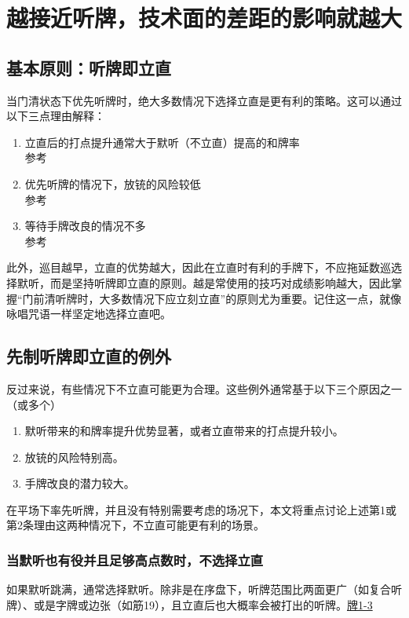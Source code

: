 \chapter[立直的判断]{越接近听牌，技术面的差距的影响就越大}
\label{lecture2}

\section{基本原则：听牌即立直}
当门清状态下优先听牌时，绝大多数情况下选择立直是更有利的策略。这可以通过以下三点理由解释：
\begin{enumerate}
    \item 立直后的打点提升通常大于默听（不立直）提高的和牌率\\
          参考
    \item 优先听牌的情况下，放铳的风险较低\\
          参考
    \item 等待手牌改良的情况不多\\
          参考
\end{enumerate}
此外，巡目越早，立直的优势越大，因此在立直时有利的手牌下，不应拖延数巡选择默听，而是坚持听牌即立直的原则。越是常使用的技巧对成绩影响越大，因此掌握“门前清听牌时，大多数情况下应立刻立直”的原则尤为重要。记住这一点，就像咏唱咒语一样坚定地选择立直吧。

\section{先制听牌即立直的例外}
反过来说，有些情况下不立直可能更为合理。这些例外通常基于以下三个原因之一（或多个）
\begin{enumerate}
    \item 默听带来的和牌率提升优势显著，或者立直带来的打点提升较小。
    \item 放铳的风险特别高。
    \item 手牌改良的潜力较大。
\end{enumerate}

在平场下率先听牌，并且没有特别需要考虑的场况下，本文将重点讨论上述第1或第2条理由这两种情况下，不立直可能更有利的场景。

\subsection{当默听也有役并且足够高点数时，不选择立直}
如果默听跳满，通常选择默听。除非是在序盘下，听牌范围比两面更广（如复合听牌）、或是字牌或边张（如筋19），且立直后也大概率会被打出的听牌。\hyperref[lec2:pai1-3]{牌1-3}


